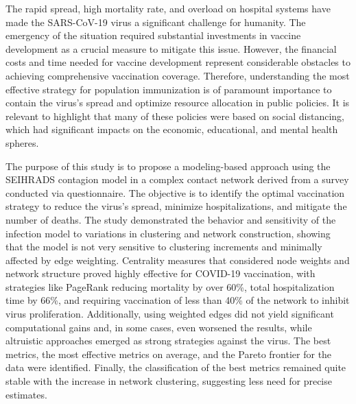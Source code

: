The rapid spread, high mortality rate, and overload on hospital systems have made the SARS-CoV-19 virus a significant challenge for humanity. The emergency of the situation required substantial investments in vaccine development as a crucial measure to mitigate this issue. However, the financial costs and time needed for vaccine development represent considerable obstacles to achieving comprehensive vaccination coverage. Therefore, understanding the most effective strategy for population immunization is of paramount importance to contain the virus's spread and optimize resource allocation in public policies. It is relevant to highlight that many of these policies were based on social distancing, which had significant impacts on the economic, educational, and mental health spheres.

The purpose of this study is to propose a modeling-based approach using the SEIHRADS contagion model in a complex contact network derived from a survey conducted via questionnaire. The objective is to identify the optimal vaccination strategy to reduce the virus's spread, minimize hospitalizations, and mitigate the number of deaths. The study demonstrated the behavior and sensitivity of the infection model to variations in clustering and network construction, showing that the model is not very sensitive to clustering increments and minimally affected by edge weighting. Centrality measures that considered node weights and network structure proved highly effective for COVID-19 vaccination, with strategies like PageRank reducing mortality by over 60\%, total hospitalization time by 66\%, and requiring vaccination of less than 40\% of the network to inhibit virus proliferation. Additionally, using weighted edges did not yield significant computational gains and, in some cases, even worsened the results, while altruistic approaches emerged as strong strategies against the virus. The best metrics, the most effective metrics on average, and the Pareto frontier for the data were identified. Finally, the classification of the best metrics remained quite stable with the increase in network clustering, suggesting less need for precise estimates.

